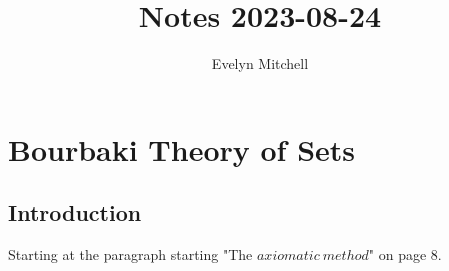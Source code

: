 \documentclass[]{scrartcl}
\title{Notes 2023-08-24}
\author{Evelyn Mitchell}
\begin{document}
\maketitle

\begin{abstract}

\end{abstract}

\section{Bourbaki Theory of Sets}

\subsection{Introduction}

Starting at the paragraph starting "The $axiomatic\ method$" on page 8.
\end{document}
